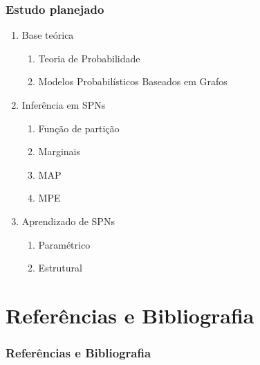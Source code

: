 \documentclass[10pt]{beamer}
\theoremstyle{plain}
\begin{document}
\begin{frame}
  \frametitle{Estudo planejado}

  \begin{enumerate}
    \item Base teórica
      \begin{enumerate}
        \item Teoria de Probabilidade
        \item Modelos Probabilísticos Baseados em Grafos
      \end{enumerate}
    \item Inferência em SPNs
      \begin{enumerate}
        \item Função de partição
        \item Marginais
        \item MAP
        \item MPE
      \end{enumerate}
    \item Aprendizado de SPNs
      \begin{enumerate}
        \item Paramétrico
        \item Estrutural
      \end{enumerate}
  \end{enumerate}
\end{frame}


\section[Referências]{Referências e Bibliografia}
\begin{frame}[t,allowframebreaks]
  \frametitle{Referências e Bibliografia}
  \footnotesize
  \nocite{bayes-net-darwiche}
  \nocite{diff-approach-darwiche}
  \nocite{inference-nphard}
  \nocite{pgm-koller}
  \nocite{pearl-1988}
  \nocite{peharz-spn}
  \printbibliography[]
\end{frame}
\end{document}
